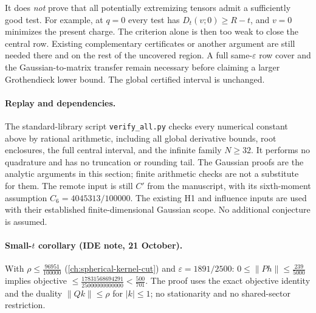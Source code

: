 It does \emph{not} prove that all potentially extremizing tensors admit
a sufficiently good test. For example, at $q=0$ every test has
$D_t(v;0)\ge R-t$, and $v=0$ minimizes the present charge. The criterion
alone is then too weak to close the central row. Existing complementary
certificates or another argument are still needed there and on the rest
of the uncovered region. A full same-$\varepsilon$ row cover and the
Gaussian-to-matrix transfer remain necessary before claiming a larger
Grothendieck lower bound. The global certified interval is unchanged.

\paragraph{Replay and dependencies.}
The standard-library script \texttt{verify\_all.py} checks every
numerical constant above by rational arithmetic, including all global
derivative bounds, root enclosures, the full central interval, and the
infinite family $N\ge32$. It performs no quadrature and has no
truncation or rounding tail. The Gaussian proofs are the analytic
arguments in this section; finite arithmetic checks are not a substitute
for them. The remote input is still $C'$ from the manuscript, with its
sixth-moment assumption $C_6=4045313/100000$. The existing H1 and
influence inputs are used with their established finite-dimensional
Gaussian scope. No additional conjecture is assumed.

\paragraph{Small-$t$ corollary (IDE note, 21 October).} With $\rho\le\frac{96951}{100000}$ (\autoref{ch:spherical-kernel-cut}) and $\varepsilon=1891/2500$:
$0\le\|Ph\|\le\frac{239}{5000}$ implies objective $\le\frac{17831568694291}{25000000000000}<\frac{500}{701}$. The proof uses the exact objective identity and the duality
$\|Qk\|\le\rho$ for $|k|\le1$; no stationarity and no shared-sector restriction.

